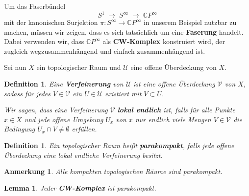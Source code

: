 \documentclass[12pt]{article}
\numberwithin{conj}{section}
\newtheorem{definition}[conj]{Definition}
\newtheorem{remark}[conj]{Anmerkung}
\newtheorem{lemma}[conj]{Lemma}
\begin{document}
                \smallskip
                
                Um das Faserbündel
                \[
                    S^1 \;\longrightarrow\; S^\infty \;\longrightarrow\; \mathbb{C}P^\infty
                \]
                mit der kanonischen Surjektion \(\pi : S^\infty \to \mathbb{C}P^\infty\) in unserem Beispiel nutzbar zu machen, müssen wir zeigen, dass es sich tatsächlich um eine \textbf{Faserung} handelt. Dabei verwenden wir, dass \(\mathbb{C}P^\infty\) als \textbf{CW-Komplex} konstruiert wird, der zugleich wegzusammenhängend und einfach zusammenhängend ist.
                
                \smallskip
                
                Sei nun \(X\) ein topologischer Raum und \(\mathcal{U}\) eine offene Überdeckung von \(X\).
                
                \begin{definition}
                    Eine \textbf{Verfeinerung} von \(\mathcal{U}\) ist eine offene Überdeckung \(\mathcal{V}\) von \(X\), sodass für jedes \(V \in \mathcal{V}\) ein \(U \in \mathcal{U}\) existiert mit \(V \subset U\).
                    
                    Wir sagen, dass eine Verfeinerung \(\mathcal{V}\) \textbf{lokal endlich} ist, falls für alle Punkte \(x \in X\) und jede offene Umgebung \(U_x\) von \(x\) nur endlich viele Mengen \(V \in \mathcal{V}\) die Bedingung \(U_x \cap V \neq \emptyset\) erfüllen.
                \end{definition}
                
                \begin{definition}
                    Ein topologischer Raum heißt \textbf{parakompakt}, falls jede offene Überdeckung eine lokal endliche Verfeinerung besitzt.
                \end{definition}
                
                \begin{remark}
                    Alle kompakten topologischen Räume sind parakompakt.
                \end{remark}
                
                \begin{lemma}
                    Jeder \textbf{CW-Komplex} ist parakompakt.
                \end{lemma}
                
\end{document}
